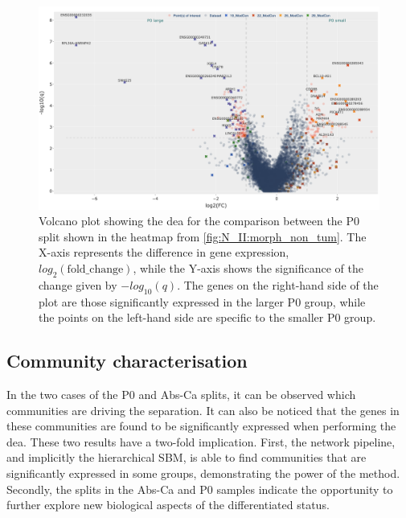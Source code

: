 \begin{figure}    
    \centering
    \includegraphics[width=1.0\textwidth,height=1.0\textheight,keepaspectratio]{Sections/Network_II/resources/non_tum/p0_split_dea.png}
    \caption{Volcano plot showing the \acrlong{dea} for the comparison between the P0 split shown in the heatmap from \cref{fig:N_II:morph_non_tum}. The X-axis represents the difference in gene expression, $log_2(\text{fold\_change})$, while the Y-axis shows the significance of the change given by $-log_{10}(q)$. The genes on the right-hand side of the plot are those significantly expressed in the larger P0 group, while the points on the left-hand side are specific to the smaller P0 group.}
    \label{fig:N_II:p0_split}
\end{figure}

\subsection{Community characterisation} \label{s:N_II:comm_charact}

In the two cases of the P0 and Abs-Ca splits, it can be observed which communities are driving the separation. It can also be noticed that the genes in these communities are found to be significantly expressed when performing the \acrlong{dea}. These two results have a two-fold implication. First, the network pipeline, and implicitly the hierarchical SBM, is able to find communities that are significantly expressed in some groups, demonstrating the power of the method. Secondly, the splits in the Abs-Ca and P0 samples indicate the opportunity to further explore new biological aspects of the differentiated status.

